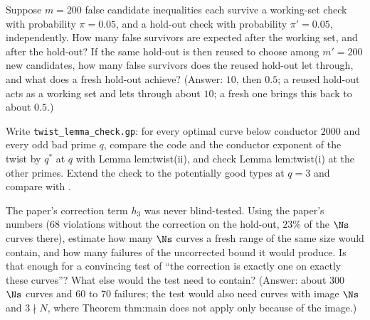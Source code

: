 \begin{sloppypar}
\begin{exercise}\label{exer:computation:multiple}
Suppose $m=200$ false candidate inequalities each survive a working-set check with probability $\pi=0.05$, and a hold-out check with probability $\pi'=0.05$,
independently. How many false survivors are expected after the working set, and after the hold-out? If the same hold-out is then reused to choose among
$m'=200$ new candidates, how many false survivors does the reused hold-out let through, and what does a fresh hold-out achieve? (Answer: $10$, then
$0.5$; a reused hold-out acts as a working set and lets through about $10$; a fresh one brings this back to about $0.5$.)
\end{exercise}

\begin{exercise}\label{exer:computation:twistcheck}
Write \texttt{twist\_lemma\_check.gp}: for every optimal curve below conductor $2000$ and every odd bad prime $q$, compare the code and the conductor exponent
of the twist by $q^*$ at $q$ with Lemma lem:twist(ii), and check Lemma lem:twist(i) at the other primes. Extend the check to the potentially good types at
$q=3$ and compare with .
\end{exercise}

\begin{exercise}\label{exer:computation:fresh-holdout}
The paper's correction term $h_3$ was never blind-tested. Using the paper's numbers ($68$ violations without the correction on the hold-out, $23\%$ of
the $\Ns$ curves there), estimate how many $\Ns$ curves a fresh range of the same size would contain, and how many failures of the uncorrected bound it
would produce. Is that enough for a convincing test of ``the correction is exactly one on exactly these curves''? What else would the test need to
contain? (Answer: about $300$ $\Ns$ curves and $60$ to $70$ failures; the test would also need curves with image $\Ns$ and $3\nmid N$, where Theorem thm:main
does not apply only because of the image.)
\end{exercise}


\end{sloppypar}
